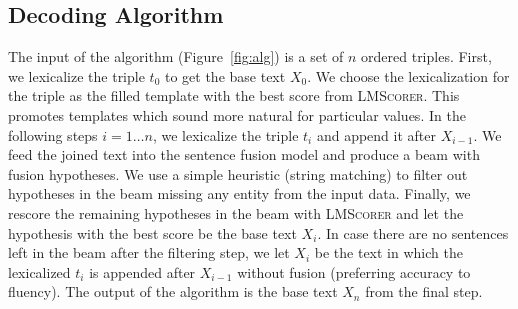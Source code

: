 \subsection{Decoding Algorithm}
\label{sec:alg}
The input of the algorithm (Figure~\ref{fig:alg}) is a set of $n$ ordered triples. First, we lexicalize the triple $t_0$ to get the base text $X_0$. We choose the lexicalization for the triple as the filled template with the best score from \textsc{LMScorer}. This promotes templates which sound more natural for particular values.
In the following steps $i=1\ldots n$, we lexicalize the triple $t_i$ and append it after $X_{i-1}$. We feed the joined text into the sentence fusion model and produce a beam with fusion hypotheses. We use a simple heuristic (string matching) to filter out hypotheses in the beam missing any entity from the input data. Finally, we rescore the remaining hypotheses in the beam with \textsc{LMScorer} and let the hypothesis with the best score be the base text $X_{i}$. In case there are no sentences left in the beam after the filtering step, we let $X_{i}$ be the text in which the lexicalized $t_i$ is appended after $X_{i-1}$ without fusion (preferring accuracy to fluency). The output of the algorithm is the base text $X_n$ from the final step.



